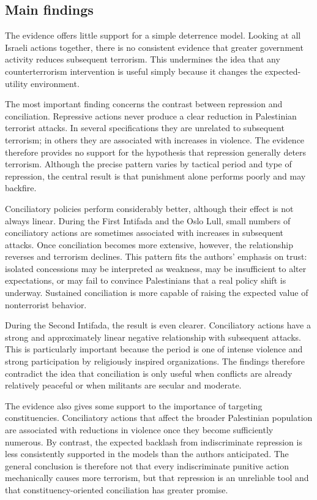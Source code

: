 \subsection{Main findings}

The evidence offers little support for a simple deterrence model. Looking at all Israeli actions together, there is no consistent evidence that greater government activity reduces subsequent terrorism. This undermines the idea that any counterterrorism intervention is useful simply because it changes the expected-utility environment.

The most important finding concerns the contrast between repression and conciliation. Repressive actions never produce a clear reduction in Palestinian terrorist attacks. In several specifications they are unrelated to subsequent terrorism; in others they are associated with increases in violence. The evidence therefore provides no support for the hypothesis that repression generally deters terrorism. Although the precise pattern varies by tactical period and type of repression, the central result is that punishment alone performs poorly and may backfire.

Conciliatory policies perform considerably better, although their effect is not always linear. During the First Intifada and the Oslo Lull, small numbers of conciliatory actions are sometimes associated with increases in subsequent attacks. Once conciliation becomes more extensive, however, the relationship reverses and terrorism declines. This pattern fits the authors' emphasis on trust: isolated concessions may be interpreted as weakness, may be insufficient to alter expectations, or may fail to convince Palestinians that a real policy shift is underway. Sustained conciliation is more capable of raising the expected value of nonterrorist behavior.

During the Second Intifada, the result is even clearer. Conciliatory actions have a strong and approximately linear negative relationship with subsequent attacks. This is particularly important because the period is one of intense violence and strong participation by religiously inspired organizations. The findings therefore contradict the idea that conciliation is only useful when conflicts are already relatively peaceful or when militants are secular and moderate.

The evidence also gives some support to the importance of targeting constituencies. Conciliatory actions that affect the broader Palestinian population are associated with reductions in violence once they become sufficiently numerous. By contrast, the expected backlash from indiscriminate repression is less consistently supported in the models than the authors anticipated. The general conclusion is therefore not that every indiscriminate punitive action mechanically causes more terrorism, but that repression is an unreliable tool and that constituency-oriented conciliation has greater promise.

